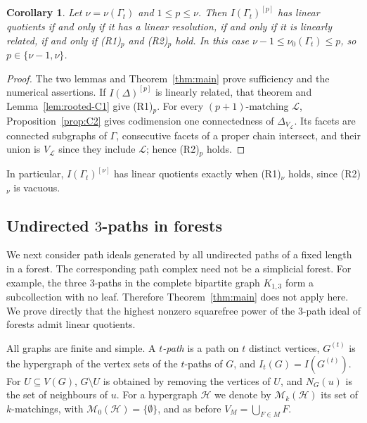 \documentclass{amsart}
\newtheorem{Corollary}[Theorem]{Corollary}
\theoremstyle{definition}
\theoremstyle{remark}
\begin{document}


\begin{Corollary}\label{cor:rooted-trees}
Let $\nu=\nu(\Gamma_t)$ and $1\leq p\leq\nu$. Then $I(\Gamma_t)^{[p]}$ has linear quotients if and only if it has a linear resolution, if and only if it is linearly related, if and only if \textnormal{(R1)$_p$} and \textnormal{(R2)$_p$} hold. In this case $\nu-1\leq\nu_0(\Gamma_t)\leq p$, so $p\in\{\nu-1,\nu\}$.
\end{Corollary}

\begin{proof}
The two lemmas and Theorem~\ref{thm:main} prove sufficiency and the numerical assertions. If $I(\Delta)^{[p]}$ is linearly related, that theorem and Lemma~\ref{lem:rooted-C1} give (R1)$_p$. For every $(p+1)$-matching $\mathcal L$, Proposition~\ref{prop:C2} gives codimension one connectedness of $\Delta_{V_{\mathcal L}}$. Its facets are connected subgraphs of $\Gamma$, consecutive facets of a proper chain intersect, and their union is $V_{\mathcal L}$ since they include $\mathcal L$; hence (R2)$_p$ holds.
\end{proof}

In particular, $I(\Gamma_t)^{[\nu]}$ has linear quotients exactly when
\textnormal{(R1)$_\nu$} holds, since \textnormal{(R2)$_\nu$} is vacuous.


\subsection{Undirected \texorpdfstring{$3$}{3}-paths in forests}\label{sec:3path}

We next consider path ideals generated by all undirected paths of a fixed length in a forest. The corresponding path complex need not be a simplicial forest. For example, the three $3$-paths in the complete bipartite graph $K_{1,3}$ form a
subcollection with no leaf. Therefore Theorem~\ref{thm:main} does not apply here. We prove directly that the highest nonzero squarefree power of the $3$-path ideal of forests admit linear quotients.

All graphs are finite and simple. A \emph{$t$-path} is a path on $t$ distinct vertices, $G^{(t)}$ is the hypergraph of the vertex sets of the $t$-paths of $G$, and $I_t(G)=I(G^{(t)})$. For $U\subseteq V(G)$, $G\setminus U$ is obtained by removing the vertices of $U$, and $N_G(u)$ is the set of neighbours of $u$. For a hypergraph $\mathcal H$ we denote by $\mathcal M_k(\mathcal H)$ its set of $k$-matchings, with $\mathcal M_0(\mathcal H)=\{\emptyset\}$, and as before $V_M=\bigcup_{F\in M}F$.
\end{document}
